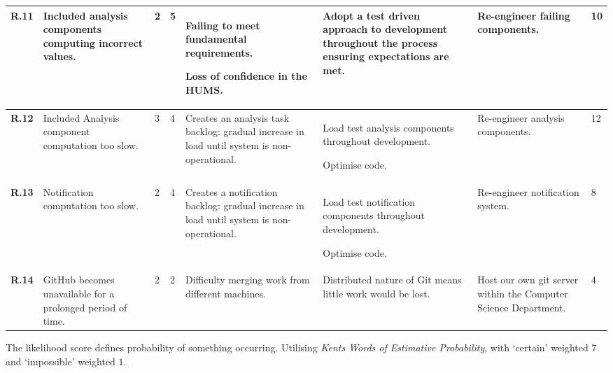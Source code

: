 \begin{longtable}[H]{| p{0.6cm} | p{2.2cm} | p{0.26cm} | p{0.26cm} | p{2.7cm} | p{3cm} | p{2.6cm} | p{0.4cm} |}
  \hline \textbf{R.11}
  & Included analysis components computing incorrect values.
  & 2
  & 5
  & Failing to meet fundamental requirements.
  
  Loss of confidence in the HUMS.
  & Adopt a test driven approach to development throughout the process
  ensuring expectations are met.
  & Re-engineer failing components.
  & 10\\
  
  \hline \textbf{R.12}
  & Included Analysis component computation too slow.
  & 3
  & 4
  & Creates an analysis task backlog: gradual increase in load until system
  is non-operational.
  & Load test analysis components throughout development.
  
    Optimise code.
  & Re-engineer analysis components.
  & 12\\  
  
  \hline \textbf{R.13}
  & Notification computation too slow.
  & 2
  & 4
  & Creates a notification backlog: gradual increase in load until system
  is non-operational.
  & Load test notification components throughout development.
 
  Optimise code.
  & Re-engineer notification system.
  & 8\\
  
  \hline \textbf{R.14}
  & GitHub becomes unavailable for a prolonged period of time.
  & 2
  & 2
  & Difficulty merging work from different machines.
  & Distributed nature of Git means little work would be lost.
  & Host our own git server within the Computer Science Department.
  & 4\\ 
    \hline
\end{longtable}       

The likelihood score defines probability of something occurring. Utilising
\textit{Kents Words of Estimative Probability}\cite{kent1966strategic}, with
`certain' weighted $7$ and `impossible' weighted $1$.

